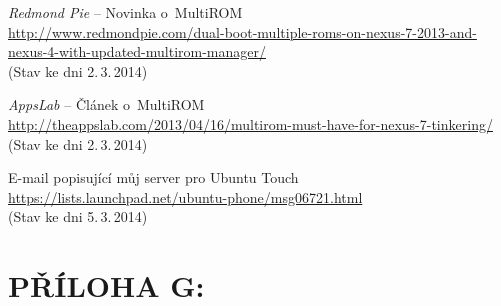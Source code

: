\documentclass[12pt, a4paper, oneside]{article}
\newcommand{\It}{\textit}  %
\begin{document}
\begin{thebibliography}{99}
     \It{Redmond Pie} -- Novinka o~MultiROM\\
    \url{http://www.redmondpie.com/dual-boot-multiple-roms-on-nexus-7-2013-and-nexus-4-with-updated-multirom-manager/}\\
    (Stav ke dni 2.\,3.\,2014)

     \It{AppsLab} -- Článek o~MultiROM\\
    \url{http://theappslab.com/2013/04/16/multirom-must-have-for-nexus-7-tinkering/}\\
    (Stav ke dni 2.\,3.\,2014)

     E-mail popisující můj server pro Ubuntu Touch\\
    \url{https://lists.launchpad.net/ubuntu-phone/msg06721.html}\\
    (Stav ke dni 5.\,3.\,2014)

\end{thebibliography}

\newpage
\section*{PŘÍLOHA G:}
~
\listoffigures   %
\end{document}
